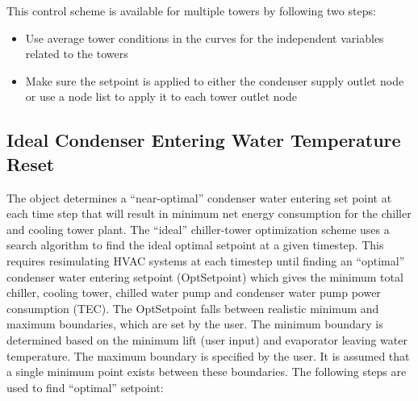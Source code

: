 This control scheme is available for multiple towers by following two steps:

\begin{itemize}
\tightlist
\item
  Use average tower conditions in the curves for the independent variables related to the towers
\item
  Make sure the setpoint is applied to either the condenser supply outlet node or use a node list to apply it to each tower outlet node
\end{itemize}

\subsection{Ideal Condenser Entering Water Temperature Reset}\label{ideal-condenser-entering-water-temperature-reset}

The object determines a ``near-optimal'' condenser water entering set point at each time step that will result in minimum net energy consumption for the chiller and cooling tower plant. The ``ideal'' chiller-tower optimization scheme uses a search algorithm to find the ideal optimal setpoint at a given timestep. This requires resimulating HVAC systems at each timestep until finding an ``optimal'' condenser water entering setpoint (OptSetpoint) which gives the minimum total chiller, cooling tower, chilled water pump and condenser water pump power consumption (TEC). The OptSetpoint falls between realistic minimum and maximum boundaries, which are set by the user. The minimum boundary is determined based on the minimum lift (user input) and evaporator leaving water temperature. The maximum boundary is specified by the user. It is assumed that a single minimum point exists between these boundaries. The following steps are used to find ``optimal'' setpoint:

